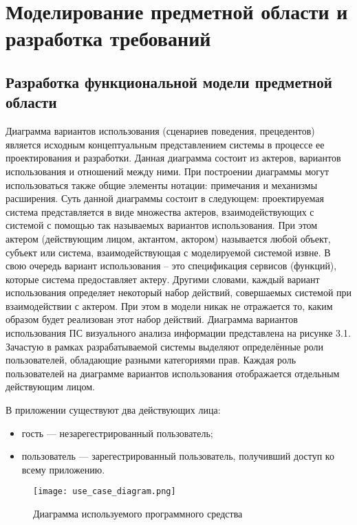 \section{Моделирование предметной области и разработка требований}
\label{sec:func}
 
\subsection{Разработка функциональной модели предметной области}
Диаграмма вариантов использования (сценариев поведения, прецедентов) является исходным концептуальным представлением системы в процессе ее проектирования и разработки. Данная диаграмма состоит из актеров, вариантов использования и отношений между ними. При построении диаграммы могут использоваться также общие элементы нотации: примечания и механизмы расширения.
Суть данной диаграммы состоит в следующем: проектируемая система представляется в виде множества актеров, взаимодействующих с системой с помощью так называемых вариантов использования. При этом актером (действующим лицом, актантом, актором) называется любой объект, субъект или система, взаимодействующая с моделируемой системой извне. В свою очередь вариант использования – это спецификация сервисов (функций), которые система предоставляет актеру. Другими словами, каждый вариант использования определяет некоторый набор действий, совершаемых системой при взаимодействии с актером. При этом в модели никак не отражается то, каким образом будет реализован этот набор действий.
Диаграмма вариантов использования ПС визуального анализа информации представлена на рисунке 3.1.
Зачастую в рамках разрабатываемой системы выделяют определённые роли пользователей, обладающие разными категориями прав. Каждая роль пользователей на диаграмме вариантов использования отображается отдельным действующим лицом.

В приложении существуют два действующих лица:
\begin{itemize}
  \item гость — незарегестрированный пользователь;
  \item пользователь — зарегестрированный пользователь, получивший доступ ко всему приложению.
\end{itemize}

\begin{figure}[H]
 \centering
   \texttt{[image: use\_case\_diagram.png]} 
   \caption{Диаграмма используемого программного средства}
   \label{fig:domain:use_case_diagram}
\end{figure}


